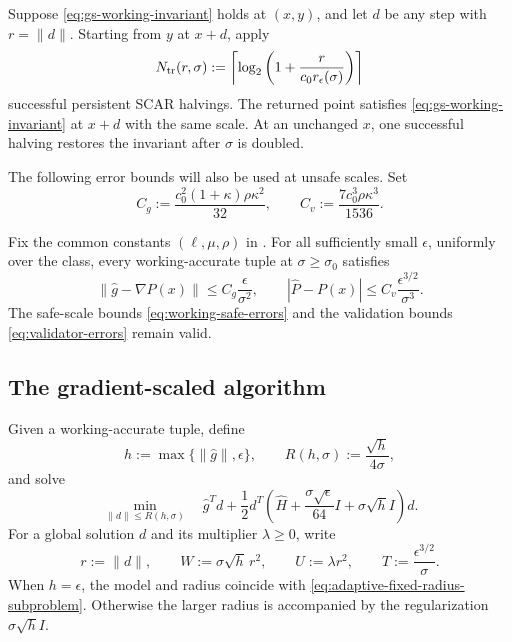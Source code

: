 \documentclass{article}
\begin{document}
\begin{lemma}
\label{lem:gs-tracking}
Suppose \eqref{eq:gs-working-invariant} holds at $(x,y)$, and let
$d$ be any step with $r=\|d\|$.  Starting from $y$ at $x+d$, apply
\begin{equation}\label{eq:gs-tracking-count}
 N_{\rm tr}(r,\sigma):=
 \left\lceil\log_2\left(
  1+\frac{r}{c_0r_\epsilon(\sigma)}
 \right)\right\rceil
\end{equation}
successful persistent SCAR halvings.  The returned point satisfies
\eqref{eq:gs-working-invariant} at $x+d$ with the same scale.
At an unchanged $x$, one successful halving restores the invariant
after $\sigma$ is doubled.
\end{lemma}

The following error bounds will also be used at unsafe scales.  Set
\begin{equation}\label{eq:gs-error-constants}
 C_g:=\frac{c_0^2(1+\kappa)\rho\kappa^2}{32},
 \qquad
 C_v:=\frac{7c_0^3\rho\kappa^3}{1536}.
\end{equation}
\begin{lemma}
\label{lem:gs-working-errors}
Fix the common constants $(\ell,\mu,\rho)$ in .
For all sufficiently small $\epsilon$, uniformly over the class,
every working-accurate tuple at $\sigma\ge\sigma_0$ satisfies
\begin{equation}\label{eq:gs-working-errors}
 \|\widehat g-\nabla P(x)\|
 \le C_g\frac{\epsilon}{\sigma^2},
 \qquad
 |\widehat P-P(x)|
 \le C_v\frac{\epsilon^{3/2}}{\sigma^3}.
\end{equation}
The safe-scale bounds \eqref{eq:working-safe-errors} and the
validation bounds \eqref{eq:validator-errors} remain valid.
\end{lemma}

\subsection{The gradient-scaled algorithm}

Given a working-accurate tuple, define
\begin{equation}\label{eq:gs-radius}
 h:=\max\{\|\widehat g\|,\epsilon\},
 \qquad R(h,\sigma):=\frac{\sqrt h}{4\sigma},
\end{equation}
and solve
\begin{equation}\label{eq:gs-subproblem}
 \min_{\|d\|\le R(h,\sigma)}\quad
 \widehat g^Td+\frac12d^T
 \left(\widehat H+\frac{\sigma\sqrt\epsilon}{64}I
                    +\sigma\sqrt h I\right)d.
\end{equation}
For a global solution $d$ and its multiplier $\lambda\ge0$, write
\begin{equation}\label{eq:gs-step-quantities}
 r:=\|d\|,
 \qquad W:=\sigma\sqrt h\,r^2,
 \qquad U:=\lambda r^2,
 \qquad T:=\frac{\epsilon^{3/2}}{\sigma}.
\end{equation}
When $h=\epsilon$, the model and radius coincide with
\eqref{eq:adaptive-fixed-radius-subproblem}.  Otherwise the larger
radius is accompanied by the regularization $\sigma\sqrt h I$.
\end{document}

